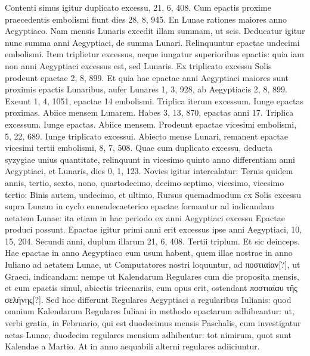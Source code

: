 Contenti simus igitur duplicato
excessu, 21, 6, 408.
Cum epactis proxime praecedentis embolismi
fiunt dies 28, 8, 945.
En Lunae rationes maiores anno Aegyptiaco.
Nam mensis Lunaris excedit illam summam, ut scis.
Deducatur
igitur nunc summa anni Aegyptiaci, de summa Lunari.
Relinquuntur
epactae undecimi embolismi.
Item triplietur excessus, neque iungatur
superioribus epactis: quia iam non anni Aegyptiaci excessus est,
sed Lunaris.
Ex triplicato excessu Solis prodeunt epactae 2, 8, 899.
Et quia hae epactae anni Aegyptiaci maiores sunt proximis epactis
 Lunaribus,
aufer Lunares 1, 3, 928, ab Aegyptiacis 2, 8, 899.
Exeunt
1, 4, 1051, epactae 14 embolismi.
Triplica iterum excessum.
Iunge
epactas proximas.
Abiice mensem Lunarem.
Habes 3, 13, 870,
epactas anni 17.
Triplica excessum.
Iunge epactas.
Abiice mensem.
Prodeunt epactae vicesimi embolismi, 5, 22, 689.
Iunge triplicato
excessui.
Abiecto mense Lunari, remanent epactae vicesimi tertii
embolismi, 8, 7, 508.
Quae cum duplicato excessu, deducta syzygiae
unius quantitate, relinquunt in vicesimo quinto anno differentiam
anni Aegyptiaci, et Lunaris, dies 0, 1, 123.
Novies igitur intercalatur:
Ternis quidem annis, tertio, sexto, nono, quartodecimo, decimo
septimo, vicesimo, vicesimo tertio: Binis autem, undecimo,
et ultimo.
Rursus quemadmodum ex Solis excessu supra Lunam in
cyclo enneadecaeterico epactae formantur ad indicandam aetatem
Lunae: ita etiam in hac periodo ex anni Aegyptiaci excessu Epactae
produci possunt.
Epactae igitur primi anni erit excessus ipse anni
Aegyptiaci, 10, 15, 204.
Secundi anni, duplum illarum 21, 6, 408.
Tertii triplum.
Et sic deinceps.
Hae epactae in anno Aegyptiaco eum
usum habent, quem illae nostrae in anno Iuliano ad aetatem Lunae, ut
Computatores nostri loquuntur, ad \textgreek{ποστιαίαν}[?],
 ut Graeci, indicandam:
nempe ut Kalendarum Regulares cum die proposita mensis, et cum
epactis simul, abiectis tricenariis, cum opus erit,
 ostendant \textgreek{ποστιαίαυ τῆς
σελήνης}[?].
Sed hoc differunt Regulares Aegyptiaci a regularibus Iulianis:
quod omnium Kalendarum Regulares Iuliani in methodo epactarum
adhibeantur: ut, verbi gratia, in Februario, qui est duodecimus
mensis Paschalis, cum investigatur aetas Lunae, duodecim regulares
mensium adhibentur: tot nimirum, quot sunt Kalendae a
Martio.
%
At in anno aequabili alterni regulares adiiciuntur.
